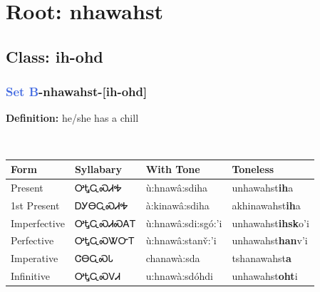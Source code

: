 \needspace{4in}
\section*{Root: nhawahst}
\nopagebreak
{}
\needspace{3in}
\subsection*{Class: ih-ohd}
\nopagebreak
\needspace{2in}
\subsubsection*{\textcolor{RoyalBlue}{Set B}{-}\textbf{nhawahst}{-}[ih-ohd]}
\nopagebreak
\textbf{Definition: } he/she has a chill
\\[0.5em]
\begin{tabularx}{\textwidth}{l X X X}%
\toprule%
\textbf{Form}&\textbf{Syllabary}&\textbf{With Tone}&\textbf{Toneless}\\%
\midrule%
Present&ᎤᎿᏩᏍᏗᎭ&ù:hnawâ:sdiha&unhawahst\textbf{ih}a\\%
1st Present&ᎠᎩᎾᏩᏍᏗᎭ&à:kinawâ:sdiha&akhinawahst\textbf{ih}a\\%
Imperfective&ᎤᎿᏩᏍᏗᏍᎪᎢ&ù:hnawâ:sdi:sgó:’i&unhawahst\textbf{ihsk}o'i\\%
Perfective&ᎤᎿᏩᏍᏔᏅᎢ&ù:hnawâ:stanv̌:’i&unhawahst\textbf{han}v'i\\%
Imperative&ᏣᎾᏩᏍᏓ&chanawà:sda&tshanawahst\textbf{a}\\%
Infinitive&ᎤᎿᏩᏍᏙᏗ&u:hnawà:sdóhdi&unhawahst\textbf{oht}i\\%
\bottomrule%
\end{tabularx}
\\[1em]